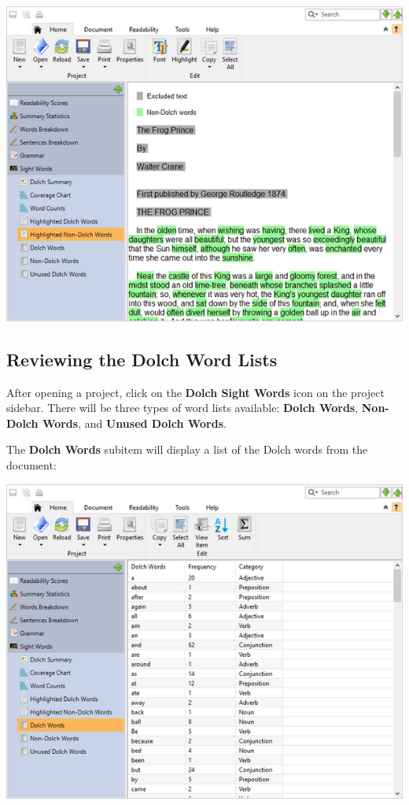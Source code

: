 \documentclass[
]{book}
\theoremstyle{definition}
\theoremstyle{definition}
\theoremstyle{definition}
\theoremstyle{definition}
\theoremstyle{remark}
\begin{document}
\includegraphics{Images/dolchhighlightednonwords.png}

\hypertarget{reviewing-dolch-lists}{%
\subsection*{Reviewing the Dolch Word Lists}\label{reviewing-dolch-lists}}

After opening a project, click on the \textbf{Dolch Sight Words} icon on the project sidebar. There will be three types of word lists available: \textbf{Dolch Words}, \textbf{Non-Dolch Words}, and \textbf{Unused Dolch Words}.

The \textbf{Dolch Words} subitem will display a list of the Dolch words from the document:

\includegraphics{Images/dolchwordslist.png}
\end{document}
